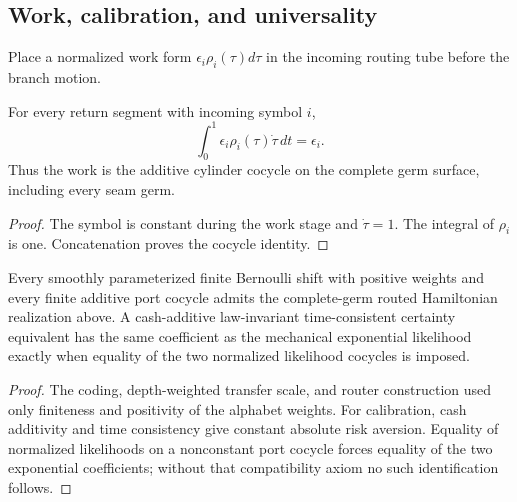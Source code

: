 \subsection{Work, calibration, and universality}

Place a normalized work form $\epsilon_i\rho_i(\tau)d\tau$ in the incoming
routing tube before the branch motion.

\begin{proposition}
\label{prop:r8-a1-work}
For every return segment with incoming symbol $i$,
\[
 \int_0^1\epsilon_i\rho_i(\tau)\dot\tau\,dt=\epsilon_i.
\]
Thus the work is the additive cylinder cocycle on the complete germ surface,
including every seam germ.
\end{proposition}

\begin{proof}
The symbol is constant during the work stage and $\dot\tau=1$.  The integral of
$\rho_i$ is one.  Concatenation proves the cocycle identity.
\end{proof}

\begin{theorem}
\label{thm:r8-a1-universality}
Every smoothly parameterized finite Bernoulli shift with positive weights and
every finite additive port cocycle admits the complete-germ routed Hamiltonian
realization above.  A cash-additive law-invariant time-consistent certainty
equivalent has the same coefficient as the mechanical exponential likelihood
exactly when equality of the two normalized likelihood cocycles is imposed.
\end{theorem}

\begin{proof}
The coding, depth-weighted transfer scale, and router construction used only
finiteness and positivity of the alphabet weights.  For calibration, cash
additivity and time consistency give constant absolute risk aversion.  Equality
of normalized likelihoods on a nonconstant port cocycle forces equality of
the two exponential coefficients; without that compatibility axiom no such
identification follows.
\end{proof}
